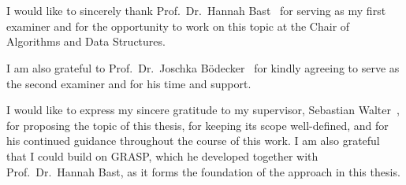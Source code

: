 \section*{}\label{sec:acknowledgements}
I would like to sincerely thank Prof.\ Dr.\ Hannah Bast~ for serving as my first examiner and for the opportunity to work on this topic at the Chair of Algorithms and Data Structures.

I am also grateful to Prof.\ Dr.\ Joschka Bödecker~ for kindly agreeing to serve as the second examiner and for his time and support.

I would like to express my sincere gratitude to my supervisor, Sebastian Walter~, for proposing the topic of this thesis, for keeping its scope well-defined, and for his continued guidance throughout the course of this work. I am also grateful that I could build on GRASP, which he developed together with Prof.\ Dr.\ Hannah Bast, as it forms the foundation of the approach in this thesis.

